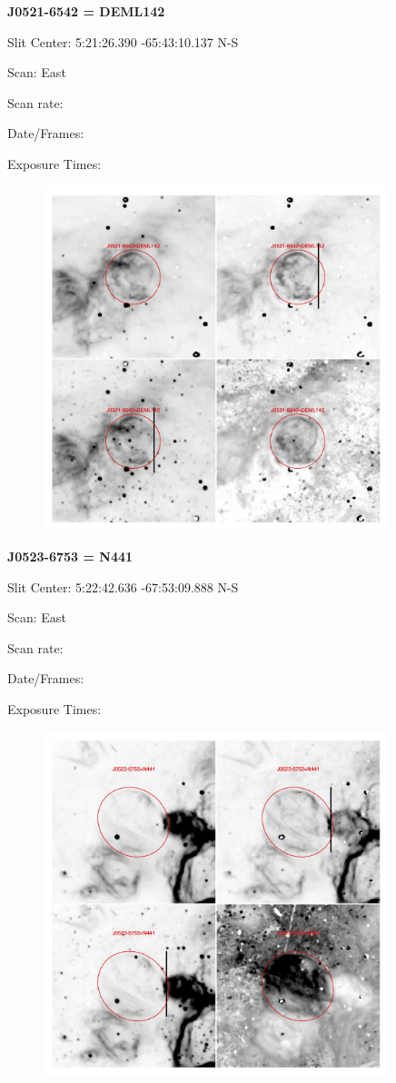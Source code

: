 \documentclass[11pt]{article}
\begin{document}
\newpage
{\bf J0521-6542 = DEML142}  
 
Slit Center:   5:21:26.390   -65:43:10.137   N-S

Scan:  East

Scan rate:  

Date/Frames:

Exposure Times:  

\begin{figure}
\includegraphics[width=10.05cm]{snapshots/J0521-6542.png}
\end{figure}

\newpage
{\bf J0523-6753 = N441}  
 
Slit Center:   5:22:42.636  -67:53:09.888 N-S

Scan:  East

Scan rate:  

Date/Frames:

Exposure Times:  

\begin{figure}
\includegraphics[width=10.05cm]{snapshots/J0523-6753.png}
\end{figure}
\end{document}
